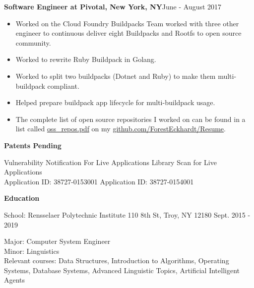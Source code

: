 \documentclass[10pt,a4papaer]{article}
\begin{document}
{		{\noindent\textbf{Software Engineer at Pivotal, New York, NY}}{\hfill June - August 2017}
		\begin{itemize}[noitemsep, topsep=0pt]
			\item Worked on the Cloud Foundry Buildpacks Team worked with three other engineer to continuous deliver eight Buildpacks and Rootfs to open source community. 
			\item Worked to rewrite Ruby Buildpack in Golang.
			\item Worked to split two buildpacks (Dotnet and Ruby) to make them multi-buildpack compliant.
			\item Helped prepare buildpack app lifecycle for multi-buildpack usage.
			\item The complete list of open source repositories I worked on can be found in a list called \href{http://www.github.com/ForestEckhardt/Resume/blob/master/oss_repos.pdf}{ oss\_repos.pdf} on my \href{http://www.github.com/ForestEckhardt/Resume}{github.com/ForestEckhardt/Resume}.\\
			
		\end{itemize}
		
		\setlength{\leftskip}{0pt}
		
		{\noindent\textbf{Patents Pending}\vspace*{-20px}\\}
		
		\noindent\makebox[\linewidth]{\rule{\textwidth}{1.2pt}}
		
		\setlength{\leftskip}{15pt}
		
		\noindent Vulnerability Notification For Live Applications {\hfill Library Scan for Live Applications}\\
		Application ID: 38727-0153001 {\hfill Application ID: 38727-0154001\quad}\\
		
		\setlength{\leftskip}{0pt}
		
		{\noindent\textbf{Education}}\vspace*{-20px}\\
		
		\noindent\makebox[\linewidth]{\rule{\textwidth}{1.3pt}}
		
		{ School: Rensselaer Polytechnic Institute 110 8th St, Troy, NY 12180 {\hfill Sept. 2015 - 2019}}
		
		\setlength{\leftskip}{50pt}
		
		{\noindent Major: Computer System Engineer\\ Minor: Linguistics\\
			Relevant courses: Data Structures, Introduction to Algorithms, Operating Systems, Database Systems, Advanced Linguistic Topics, Artificial Intelligent Agents}\\
		
}
\end{document}
